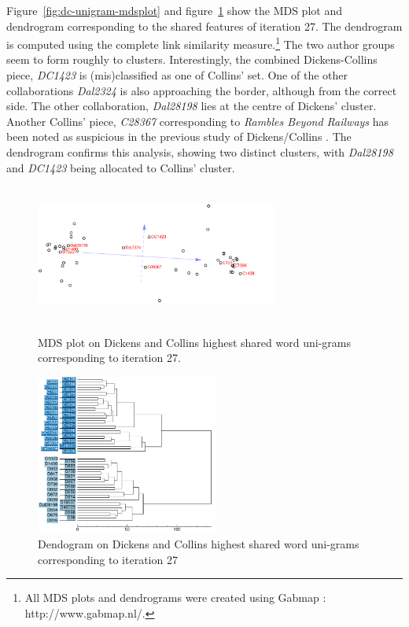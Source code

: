 \documentclass[a4paper,10pt,twoside,fleqn]{article}
\begin{document}
Figure~\ref{fig:dc-unigram-mdsplot} and figure~\ref{fig:dc-unigram-dendo} 
show the MDS plot and dendrogram corresponding to the shared features of 
iteration 27.
The dendrogram is computed using the complete link similarity 
measure.\footnote{All MDS plots and dendrograms 
were created using Gabmap \cite{nerbonne2011gabmap}: http://www.gabmap.nl/. }
The two author groups seem to form roughly to clusters. 
Interestingly, the combined Dickens-Collins piece, \emph{DC1423} is 
(mis)classified as one of Collins' set. One of the other collaborations 
\emph{Dal2324} is also approaching the border, although from the correct
side. The other collaboration, \emph{Dal28198} lies at the centre of
Dickens' cluster. 
Another Collins' piece, \emph{C28367} corresponding to 
\emph{Rambles Beyond Railways} has been noted as suspicious in the 
previous study of Dickens/Collins \cite{Tabata2012}.
The dendrogram confirms this analysis, showing two distinct 
clusters, with \emph{Dal28198} and \emph{DC1423} being allocated
to Collins' cluster. 



\begin{figure}
\centering
\parbox{8cm}{
\includegraphics[width=8cm,height=4.5cm]{mdsplot/dc-wuni-DC1423.pdf}
\caption{MDS plot on Dickens and Collins highest shared word uni-grams 
corresponding to iteration 27.}
\label{fig:dc-unigram-mdsplot}}
\qquad
\begin{minipage}{6cm}
\includegraphics[width=6cm]{dend/dc-wuni-cl-DC1423.pdf}
\caption{Dendogram on Dickens and Collins highest shared word uni-grams 
corresponding to iteration 27}
\label{fig:dc-unigram-dendo}
\end{minipage}
\end{figure}
\end{document}
